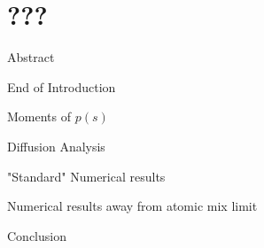 \documentclass[12pt]{article}
\begin{document}
\section{???}


Abstract

End of Introduction

Moments of $p(s)$

Diffusion Analysis

"Standard" Numerical results

Numerical results away from atomic mix limit

Conclusion

\pagebreak
\begin{singlespace}


\end{singlespace}
\end{document}
